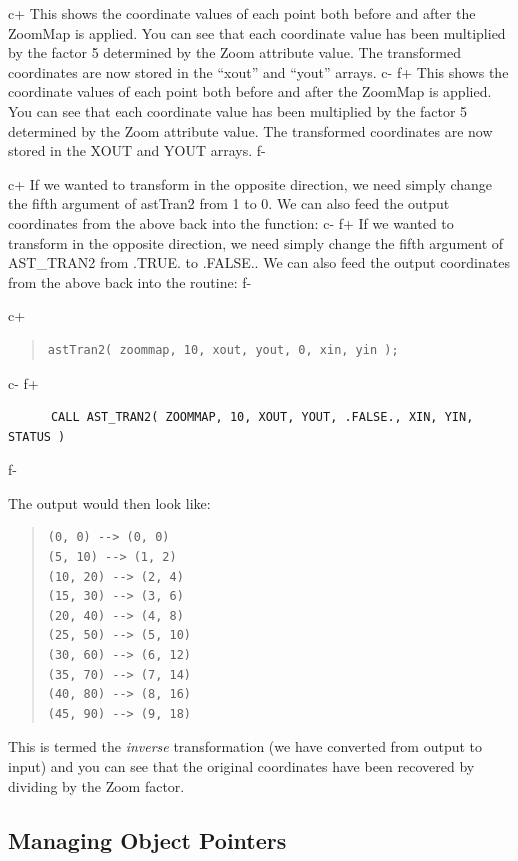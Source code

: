 \documentclass[twoside,11pt]{article}
\begin{document}
c+
This shows the coordinate values of each point both before and after
the ZoomMap is applied. You can see that each coordinate value has
been multiplied by the factor 5 determined by the Zoom attribute
value. The transformed coordinates are now stored in the ``xout'' and
``yout'' arrays.
c-
f+
This shows the coordinate values of each point both before and after
the ZoomMap is applied. You can see that each coordinate value has
been multiplied by the factor 5 determined by the Zoom attribute
value. The transformed coordinates are now stored in the XOUT and YOUT
arrays.
f-

c+
If we wanted to transform in the opposite direction, we need simply
change the fifth argument of astTran2 from 1 to 0. We can also feed
the output coordinates from the above back into the function:
c-
f+
If we wanted to transform in the opposite direction, we need simply
change the fifth argument of AST\_TRAN2 from .TRUE. to .FALSE.. We can
also feed the output coordinates from the above back into the routine:
f-

c+
\begin{quote}
\small
\begin{verbatim}
astTran2( zoommap, 10, xout, yout, 0, xin, yin );
\end{verbatim}
\normalsize
\end{quote}
c-
f+
\small
\begin{verbatim}
      CALL AST_TRAN2( ZOOMMAP, 10, XOUT, YOUT, .FALSE., XIN, YIN, STATUS )
\end{verbatim}
\normalsize
f-

The output would then look like:

\begin{quote}
\small
\begin{verbatim}
(0, 0) --> (0, 0)
(5, 10) --> (1, 2)
(10, 20) --> (2, 4)
(15, 30) --> (3, 6)
(20, 40) --> (4, 8)
(25, 50) --> (5, 10)
(30, 60) --> (6, 12)
(35, 70) --> (7, 14)
(40, 80) --> (8, 16)
(45, 90) --> (9, 18)
\end{verbatim}
\normalsize
\end{quote}

This is termed the {\em{inverse}} transformation (we have converted
from output to input) and you can see that the original coordinates
have been recovered by dividing by the Zoom factor.

\subsection{\label{ss:annullingpointers}Managing Object Pointers}
\end{document}
